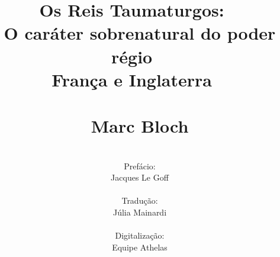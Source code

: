 \documentclass[a5paper]{book}
\begin{document}
\frontmatter
\title{Os Reis Taumaturgos: ~\\O caráter sobrenatural do poder régio ~\\França e Inglaterra ~\\ ~\\Marc Bloch}
\author{\\Prefácio: \\ Jacques Le Gof{\kern0pt}f \\ \\ Tradução: \\ Júlia Mainardi \\ \\Digitalização:\\Equipe Athelas}
\date{}
\maketitle
\end{document}
